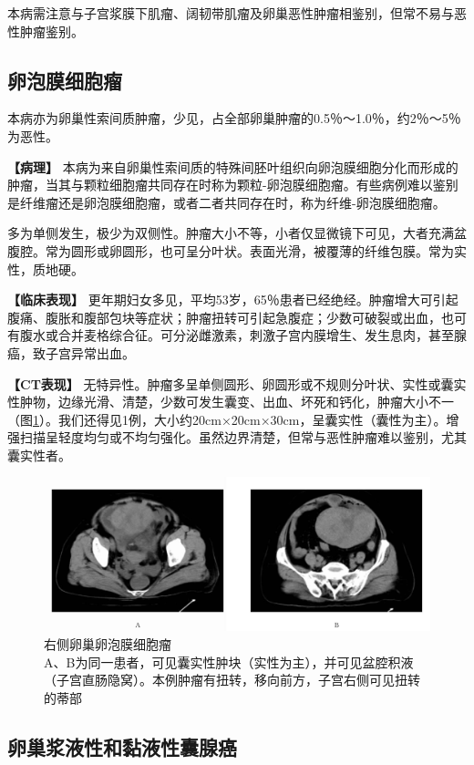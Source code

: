 本病需注意与子宫浆膜下肌瘤、阔韧带肌瘤及卵巢恶性肿瘤相鉴别，但常不易与恶性肿瘤鉴别。

\subsection{卵泡膜细胞瘤}

本病亦为卵巢性索间质肿瘤，少见，占全部卵巢肿瘤的0.5％～1.0％，约2％～5％为恶性。

\textbf{【病理】}
本病为来自卵巢性索间质的特殊间胚叶组织向卵泡膜细胞分化而形成的肿瘤，当其与颗粒细胞瘤共同存在时称为颗粒-卵泡膜细胞瘤。有些病例难以鉴别是纤维瘤还是卵泡膜细胞瘤，或者二者共同存在时，称为纤维-卵泡膜细胞瘤。

多为单侧发生，极少为双侧性。肿瘤大小不等，小者仅显微镜下可见，大者充满盆腹腔。常为圆形或卵圆形，也可呈分叶状。表面光滑，被覆薄的纤维包膜。常为实性，质地硬。

\textbf{【临床表现】}
更年期妇女多见，平均53岁，65％患者已经绝经。肿瘤增大可引起腹痛、腹胀和腹部包块等症状；肿瘤扭转可引起急腹症；少数可破裂或出血，也可有腹水或合并麦格综合征。可分泌雌激素，刺激子宫内膜增生、发生息肉，甚至腺癌，致子宫异常出血。

\textbf{【CT表现】}
无特异性。肿瘤多呈单侧圆形、卵圆形或不规则分叶状、实性或囊实性肿物，边缘光滑、清楚，少数可发生囊变、出血、坏死和钙化，肿瘤大小不一（图\ref{fig21-15}）。我们还得见1例，大小约20cm×20cm×30cm，呈囊实性（囊性为主）。增强扫描呈轻度均匀或不均匀强化。虽然边界清楚，但常与恶性肿瘤难以鉴别，尤其囊实性者。

\begin{figure}[!htbp]
 \centering
 \includegraphics[width=.7\textwidth,height=\textheight,keepaspectratio]{./images/Image00413.jpg}
 \captionsetup{justification=centering}
 \caption{右侧卵巢卵泡膜细胞瘤\\{\small A、B为同一患者，可见囊实性肿块（实性为主），并可见盆腔积液（子宫直肠隐窝）。本例肿瘤有扭转，移向前方，子宫右侧可见扭转的蒂部}}
 \label{fig21-15}
  \end{figure} 

\subsection{卵巢浆液性和黏液性囊腺癌}

